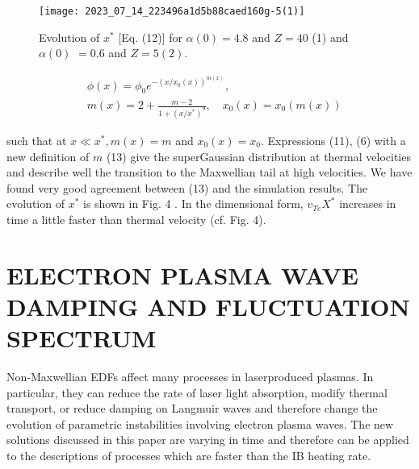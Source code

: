 \documentclass[oneside,onecolumn]{article}
\begin{document}
\begin{sloppypar}
 \begin{figure}[tbp]
 	\centering
 	\texttt{[image: 2023\_07\_14\_223496a1d5b88caed160g-5(1)]}
 	\caption{Evolution of $x^{*}$ [Eq. (12)] for $\alpha(0)=4.8$ and $Z=40$ (1) and $\alpha(0)$ $=0.6$ and $Z=5(2)$.}
 	\label{fig4.}
 \end{figure}
 
 \begin{dmath}[compact]
 \begin{aligned}
 & \phi(x)=\phi_{0} e^{-\left(x / x_{0}(x)\right)^{m(x)}}, \\
 & m(x)=2+\frac{m-2}{1+\left(x / x^{*}\right)^{9}}, \quad x_{0}(x)=x_{0}(m(x))
 \end{aligned}
 \end{dmath}
 
 such that at $x \ll x^{*}, m(x)=m$ and $x_{0}(x)=x_{0}$. Expressions (11), (6) with a new definition of $m$ (13) give the superGaussian distribution at thermal velocities and describe well the transition to the Maxwellian tail at high velocities. We have found very good agreement between (13) and the simulation results. The evolution of $x^{*}$ is shown in Fig. 4 . In the dimensional form, $v_{T e} X^{*}$ increases in time a little faster than thermal velocity (cf. Fig. 4).
 
 \section{ELECTRON PLASMA WAVE DAMPING AND FLUCTUATION SPECTRUM}
 Non-Maxwellian EDFs affect many processes in laserproduced plasmas. In particular, they can reduce the rate of laser light absorption, modify thermal transport, or reduce damping on Langmuir waves and therefore change the evolution of parametric instabilities involving electron plasma waves. The new solutions discussed in this paper are varying in time and therefore can be applied to the descriptions of processes which are faster than the IB heating rate.
 

\end{sloppypar}
\end{document}
